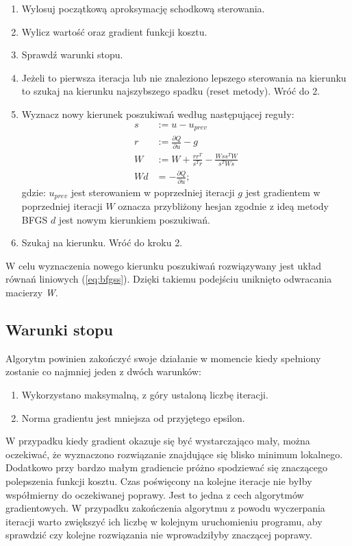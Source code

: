 \begin{enumerate}
\item Wylosuj początkową aproksymację schodkową sterowania.
\item Wylicz wartość oraz gradient funkcji kosztu.
\item Sprawdź warunki stopu.
\item Jeżeli to pierwsza iteracja lub nie znaleziono lepszego sterowania na kierunku to szukaj na kierunku najszybszego spadku (reset metody). Wróć do 2.
\item Wyznacz nowy kierunek poszukiwań według następującej reguły:
\begin{equation}
\label{eq:bfgss}
\begin{aligned}
s &:= u - u_{prev}\\
r &:= \frac{\partial Q}{\partial u} - g\\
W &:= W + \frac{rr^T}{s^Tr} - \frac{Wss^TW}{s^TWs}\\
Wd &= -\frac{\partial Q}{\partial u};
\end{aligned}
\end{equation}
\noindent gdzie:\newline
\(u_{prev}\) jest sterowaniem w poprzedniej iteracji\newline
\(g\) jest gradientem w poprzedniej iteracji\newline
\(W\) oznacza przybliżony hesjan zgodnie z ideą metody BFGS\newline
\(d\) jest nowym kierunkiem poszukiwań.
\item Szukaj na kierunku. Wróć do kroku 2.
\end{enumerate}
W celu wyznaczenia nowego kierunku poszukiwań rozwiązywany jest układ równań liniowych (\ref{eq:bfgss}). Dzięki takiemu podejściu uniknięto odwracania macierzy \textit{W}.
\subsection{Warunki stopu}
Algorytm powinien zakończyć swoje działanie w momencie kiedy spełniony zostanie co najmniej jeden z dwóch warunków: 
\begin{enumerate}
\item Wykorzystano maksymalną, z góry ustaloną liczbę iteracji.
\item Norma gradientu jest mniejsza od przyjętego epsilon.
\end{enumerate}
W przypadku kiedy gradient okazuje się być wystarczająco mały, można oczekiwać, że wyznaczono rozwiązanie znajdujące się blisko minimum lokalnego. Dodatkowo przy bardzo małym gradiencie próżno spodziewać się znaczącego polepszenia funkcji kosztu. Czas poświęcony na kolejne iteracje nie byłby współmierny do oczekiwanej poprawy. Jest to jedna z cech algorytmów gradientowych. W przypadku zakończenia algorytmu z powodu wyczerpania iteracji warto zwiększyć ich liczbę w kolejnym uruchomieniu programu, aby sprawdzić czy kolejne rozwiązania nie wprowadziłyby znaczącej poprawy.

